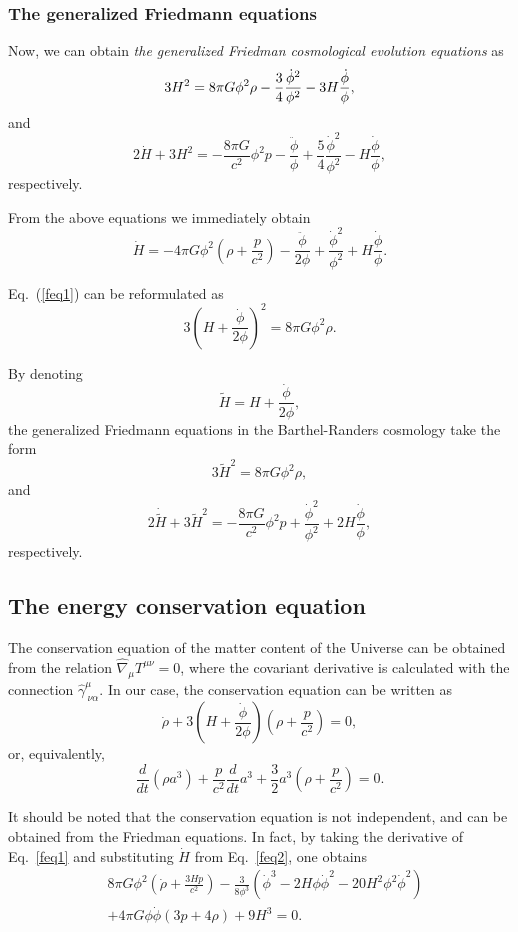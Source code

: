 \documentclass[aps,superscriptaddress, showpacs,preprintnumbers, superscriptaddress, nofootinbibt,twocolumn]{revtex4-2}
\def\be{\begin{equation}}
\def\ee{\end{equation}}
\begin{document}
\subsubsection{The generalized Friedmann equations}

Now, we can obtain {\it the generalized Friedman cosmological evolution equations} as
\begin{equation}\label{feq1}
3H^{2}=8\pi G\phi ^2 \rho -\frac{3}{4}\frac{\dot{\phi} ^{ 2}}{\phi ^{2}}-3H\frac{%
\dot{\phi}}{\phi },
\end{equation}
and
\begin{equation}\label{feq2}
2\dot{H}+3H^{2}=-\frac{8\pi G}{c^{2}}\phi ^{2}p-\frac{\ddot{\phi}}{\phi }+%
\frac{5}{4}\frac{\dot{\phi}^{2}}{\phi ^{2}}-H\frac{\dot{\phi}}{\phi },
\end{equation}
respectively.

From the above equations we immediately obtain
\be
\dot{H}=-4\pi G \phi^2\left(\rho +\frac{p}{c^2}\right)-\frac{\ddot{\phi}}{2\phi}+\frac{\dot{\phi}^2}{\phi^2}+H\frac{\dot{\phi}}{\phi}.
\ee

Eq.~(\ref{feq1}) can be reformulated as
\be
3\left(H+\frac{\dot{\phi}}{2\phi}\right)^2=8\pi G \phi ^2 \rho.
\ee

By denoting
\be
\tilde{H}=H+\frac{\dot{\phi}}{2\phi},
\ee
the generalized Friedmann equations in the Barthel-Randers cosmology take the form
\be
3\tilde{H}^2=8\pi G \phi ^2 \rho,
\ee
and
\be
2\dot{\tilde{H}}+3\tilde{H}^2=-\frac{8\pi G}{c^2}\phi ^2p+\frac{\dot{\phi}^2}{\phi ^2} +2H\frac{\dot{\phi}}{\phi},
\ee
respectively.

\subsection{The energy conservation equation}

The conservation equation of the matter content of the
Universe can be obtained from the relation $\hat\nabla_\mu T^{\mu\nu}=0$, where the covariant derivative is calculated with the connection $\hat\gamma^\mu_{~\nu\alpha}$. In our case, the conservation equation can be written as
\begin{equation}\label{cons}
\dot{\rho}+3\left(H+\frac{\dot\phi}{2\phi}\right)\left( \rho +\frac{p}{c^2}\right) =0,
\end{equation}
or, equivalently,
\be
\frac{d}{dt}\left(\rho a^3\right)+\frac{p}{c^2}\frac{d}{dt}a^3+\frac{3}{2}a^3\left(\rho +\frac{p}{c^2}\right)=0.
\ee

It should be noted that the conservation equation is not independent, and can be obtained from the Friedman equations. In fact, by taking the derivative of Eq.~\eqref{feq1} and substituting $\dot H$ from Eq.~\eqref{feq2}, one obtains
\begin{align}
&8\pi G\phi^2\left(\dot\rho+\frac{3H p}{c^2}\right)-\frac{3}{8\phi^3}(\dot\phi^3-2H\phi\dot\phi^2-20H^2\phi^2\dot\phi^2)\nonumber\\&+4\pi G\phi\dot\phi(3p+4\rho)+9H^3=0.
\end{align}
\end{document}
